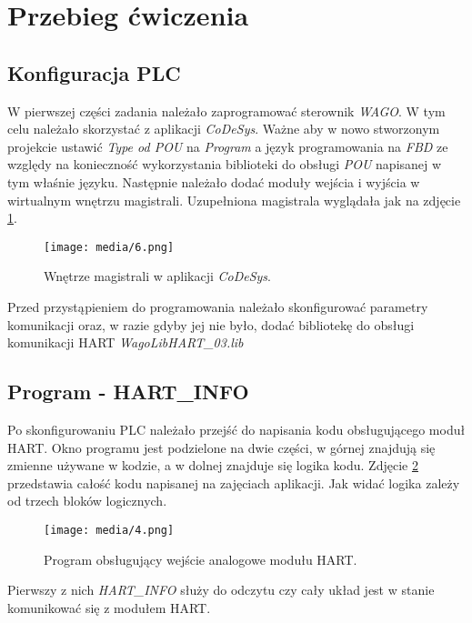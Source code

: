 \documentclass{article}
\begin{document}
\section{Przebieg ćwiczenia}

\subsection{Konfiguracja PLC}
W pierwszej części zadania należało zaprogramować sterownik \textit{WAGO}. W tym celu należało skorzystać z aplikacji \textit{CoDeSys}. Ważne aby w nowo stworzonym projekcie ustawić \textit{Type od POU} na \textit{Program} a język programowania na \textit{FBD} ze względy na konieczność wykorzystania biblioteki do obsługi \textit{POU} napisanej w tym właśnie języku. Następnie należało dodać moduły wejścia i wyjścia w wirtualnym wnętrzu magistrali. Uzupełniona magistrala wyglądała jak na zdjęcie \ref{fig1}.

\vspace{1em}
\begin{figure}[ht]
    \centering
    \texttt{[image: media/6.png]}
    \caption{Wnętrze magistrali w aplikacji \textit{CoDeSys}.}
    \label{fig1}
\end{figure}

Przed przystąpieniem do programowania należało skonfigurować parametry komunikacji oraz, w razie gdyby jej nie było, dodać bibliotekę do obsługi komunikacji HART \textit{WagoLibHART\_03.lib}
\newpage


\subsection{Program - HART\_INFO} \label{1a}
Po skonfigurowaniu PLC należało przejść do napisania kodu obsługującego moduł HART. Okno programu jest podzielone na dwie części, w górnej znajdują się zmienne używane w kodzie, a w dolnej znajduje się logika kodu. Zdjęcie \ref{fig2} przedstawia całość kodu napisanej na zajęciach aplikacji. Jak widać logika zależy od trzech bloków logicznych.

\vspace{1em}
\begin{figure}[ht]
    \centering
    \texttt{[image: media/4.png]}
    \caption{Program obsługujący wejście analogowe modułu HART.}
    \label{fig2}
\end{figure}
\vspace{2em}

Pierwszy z nich \textit{HART\_INFO} służy do odczytu czy cały układ jest w stanie komunikować się z modułem HART. 
\end{document}
